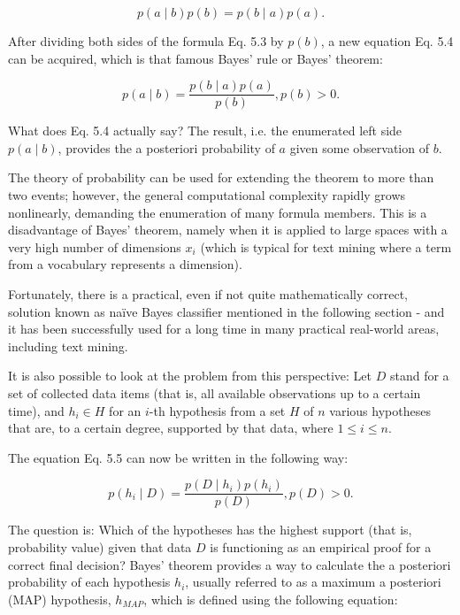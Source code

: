\documentclass[10pt]{book}
\begin{document}
\begin{equation*}
p(a \mid b) p(b)=p(b \mid a) p(a) . \tag{5.3}
\end{equation*}


After dividing both sides of the formula Eq. 5.3 by $p(b)$, a new equation Eq. 5.4 can be acquired, which is that famous Bayes' rule or Bayes' theorem:


\begin{equation*}
p(a \mid b)=\frac{p(b \mid a) p(a)}{p(b)}, p(b)>0 . \tag{5.4}
\end{equation*}


What does Eq. 5.4 actually say? The result, i.e. the enumerated left side $p(a \mid b)$, provides the a posteriori probability of $a$ given some observation of $b$.

The theory of probability can be used for extending the theorem to more than two events; however, the general computational complexity rapidly grows nonlinearly, demanding the enumeration of many formula members. This is a disadvantage of Bayes' theorem, namely when it is applied to large spaces with a very high number of dimensions $x_{i}$ (which is typical for text mining where a term from a vocabulary represents a dimension).

Fortunately, there is a practical, even if not quite mathematically correct, solution known as naïve Bayes classifier mentioned in the following section - and it has been successfully used for a long time in many practical real-world areas, including text mining.

It is also possible to look at the problem from this perspective: Let $D$ stand for a set of collected data items (that is, all available observations up to a certain time), and $h_{i} \in H$ for an $i$-th hypothesis from a set $H$ of $n$ various hypotheses that are, to a certain degree, supported by that data, where $1 \leq i \leq n$.

The equation Eq. 5.5 can now be written in the following way:


\begin{equation*}
p\left(h_{i} \mid D\right)=\frac{p\left(D \mid h_{i}\right) p\left(h_{i}\right)}{p(D)}, p(D)>0 . \tag{5.5}
\end{equation*}


The question is: Which of the hypotheses has the highest support (that is, probability value) given that data $D$ is functioning as an empirical proof for a correct final decision? Bayes' theorem provides a way to calculate the a posteriori probability of each hypothesis $h_{i}$, usually referred to as a maximum a posteriori (MAP) hypothesis, $h_{M A P}$, which is defined using the following equation:
\end{document}
